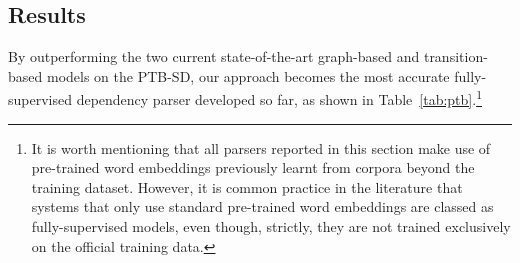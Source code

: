 \documentclass[11pt,a4paper]{article}
\begin{document}
\subsection{Results}
By outperforming the two current state-of-the-art graph-based \cite{DozatM16} and transition-based \cite{Ma18} models on the PTB-SD, our approach becomes the most accurate
fully-supervised
dependency parser developed so far, as shown in Table~\ref{tab:ptb}.\footnote{It is worth mentioning that all parsers reported in this section make use of pre-trained word embeddings previously learnt from corpora beyond the training dataset. However, it is common practice in the literature that systems that only use standard pre-trained word embeddings are classed as fully-supervised models, even though, strictly, they are not trained exclusively on the official training data.} 
\end{document}
